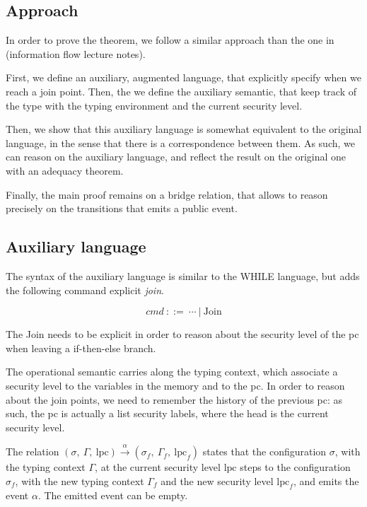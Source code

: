 \documentclass[10pt]{article}
\newcommand{\lpc}{\mathrm{lpc}}
\newcommand{\ctx}{\Gamma}
\newcommand{\conf}{\sigma}
\newcommand{\execaux}[7] { (#1,~#2,~#3) \xrightarrow{#4} (#5,~#6,~#7) }
\begin{document}
\subsection{Approach}%
\label{subsec:approach}

In order to prove the theorem, we follow a similar approach than the one in (information flow
lecture notes).

First, we define an auxiliary, augmented language, that explicitly specify when we reach a join
point. Then, the we define the auxiliary semantic, that keep track of the type with the typing
environment and the current security level.

Then, we show that this auxiliary language is somewhat equivalent to the original language, in the
sense that there is a correspondence between them. As such, we can reason on the auxiliary language,
and reflect the result on the original one with an adequacy theorem.

Finally, the main proof remains on a bridge relation, that allows to reason precisely on the
transitions that emits a public event.

\subsection{Auxiliary language}%
\label{subsec:aux_lang}

The syntax of the auxiliary language is similar to the WHILE language, but adds the following
command explicit \emph{join}.

\[ \mathit{cmd}~::=~\cdots~|~\mathrm{Join} \]

The Join needs to be explicit in order to reason about the security level of the pc when leaving a
if-then-else branch.

The operational semantic carries along the typing context, which associate a security level to the
variables in the memory and to the pc. In order to reason about the join points, we need to remember
the history of the previous pc: as such, the pc is actually a list security labels, where the head
is the current security level.

The relation \(\execaux{\conf}{\ctx}{\lpc}{\alpha}{\conf_{f}}{\ctx_{f}}{\lpc_{f}} \)
states that the configuration $\conf$, with the typing context $\ctx$, at the current security level
$\lpc$ steps to the configuration $\conf_{f}$, with the new typing context $\ctx_{f}$ and the new
security level $\lpc_{f}$, and emits the event $\alpha$. The emitted event can be empty.
\end{document}
